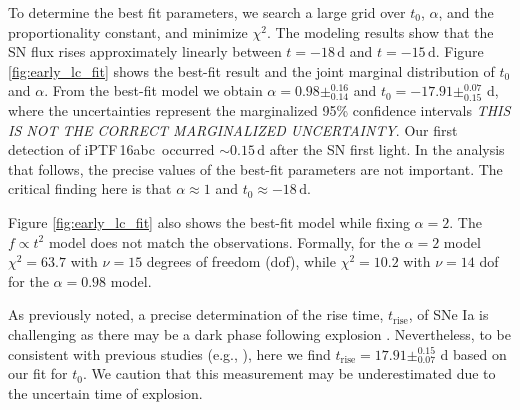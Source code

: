 \documentclass[twocolumn]{aastex61}
\newcommand{\abc}{iPTF\,16abc}
\begin{document}
To determine the best fit parameters, we search a large grid over $t_0$,
$\alpha$, and the proportionality constant, and minimize $\chi^2$. The
modeling results show that the SN flux rises approximately linearly between
$t=-18\,\textrm{d}$ and $t=-15\,\textrm{d}$. Figure \ref{fig:early_lc_fit}
shows the best-fit result and the joint marginal distribution of $t_0$ and
$\alpha$. From the best-fit model we obtain $\alpha=0.98 \pm ^{0.16}_{0.14}$
and $t_0=-17.91 \pm ^{0.07}_{0.15}$ d, where the uncertainties represent the
marginalized 95\% confidence intervals \textit{THIS IS NOT THE CORRECT MARGINALIZED UNCERTAINTY}. Our first detection of \abc\ occurred
$\sim$${0.15}\,\textrm{d}$ after the SN first light. In the analysis that
follows, the precise values of the best-fit parameters are not important. The
critical finding here is that $\alpha \approx 1$ and $t_0 \approx -18 \,
\mathrm{d}$.

Figure \ref{fig:early_lc_fit} also shows the best-fit model while fixing
$\alpha = 2$. The $f \propto t^2$ model does not match the observations.
Formally, for the $\alpha = 2$ model $\chi^2 = 63.7$ with $\nu = 15$ degrees
of freedom (dof), while $\chi^2 = 10.2$ with $\nu = 14$ dof for the $\alpha =
0.98$ model.

As previously noted, a precise determination of the rise time,
$t_\mathrm{rise}$, of SNe Ia is challenging as there may be a dark phase
following explosion \citep{2014ApJ...784...85P}. Nevertheless, to be
consistent with previous studies (e.g., \citealt{2011MNRAS.416.2607G}), here
we find $t_\mathrm{rise} = 17.91\pm _{0.07}^{0.15}$ d based on our fit for
$t_0$. We caution that this measurement may be underestimated due to the
uncertain time of explosion.
\end{document}
